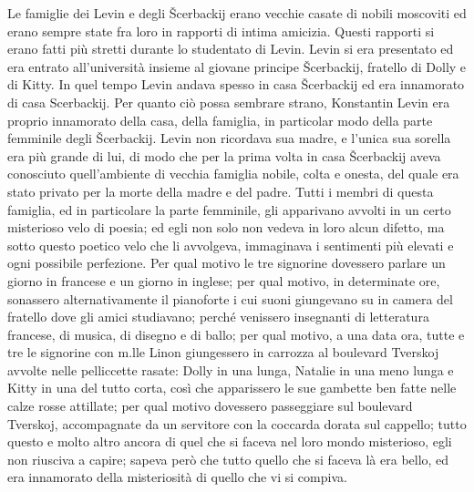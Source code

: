 Le famiglie dei Levin e degli Šcerbackij erano vecchie casate di nobili moscoviti ed erano sempre state fra loro in rapporti di intima amicizia. Questi rapporti si erano fatti più stretti durante lo studentato di Levin. Levin si era presentato ed era entrato all'università insieme al giovane principe Šcerbackij, fratello di Dolly e di Kitty. In quel tempo Levin andava spesso in casa Šcerbackij ed era innamorato di casa Scerbackij. Per quanto ciò possa sembrare strano, Konstantin Levin era proprio innamorato della casa, della famiglia, in particolar modo della parte femminile degli Šcerbackij. Levin non ricordava sua madre, e l'unica sua sorella era più grande di lui, di modo che per la prima volta in casa Šcerbackij aveva conosciuto quell'ambiente di vecchia famiglia nobile, colta e onesta, del quale era stato privato per la morte della madre e del padre. Tutti i membri di questa famiglia, ed in particolare la parte femminile, gli apparivano avvolti in un certo misterioso velo di poesia; ed egli non solo non vedeva in loro alcun difetto, ma sotto questo poetico velo che li avvolgeva, immaginava i sentimenti più elevati e ogni possibile perfezione. Per qual motivo le tre signorine dovessero parlare un giorno in francese e un giorno in inglese; per qual motivo, in determinate ore, sonassero alternativamente il pianoforte i cui suoni giungevano su in camera del fratello dove gli amici studiavano; perché venissero insegnanti di letteratura francese, di musica, di disegno e di ballo; per qual motivo, a una data ora, tutte e tre le signorine con m.lle Linon giungessero in carrozza al boulevard Tverskoj avvolte nelle pelliccette rasate: Dolly in una lunga, Natalie in una meno lunga e Kitty in una del tutto corta, così che apparissero le sue gambette ben fatte nelle calze rosse attillate; per qual motivo dovessero passeggiare sul boulevard Tverskoj, accompagnate da un servitore con la coccarda dorata sul cappello; tutto questo e molto altro ancora di quel che si faceva nel loro mondo misterioso, egli non riusciva a capire; sapeva però che tutto quello che si faceva là era bello, ed era innamorato della misteriosità di quello che vi si compiva. 

